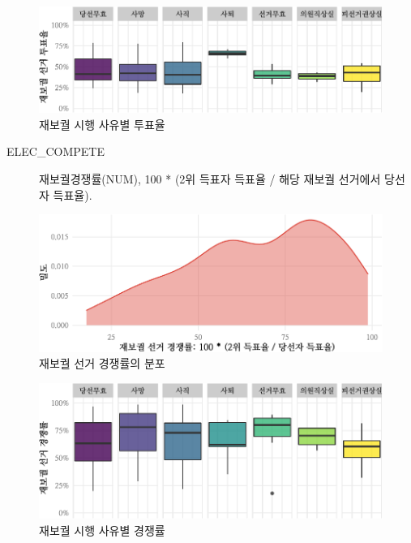 \documentclass[
  11pt,
  letter]{article}
\begin{document}
\begin{figure}
\centering
\includegraphics{Codebook_national_files/figure-latex/unnamed-chunk-4-1.pdf}
\caption{재보궐 시행 사유별 투표율}
\end{figure}

\begin{description}
\item[ELEC\_COMPETE]
재보궐경쟁률(NUM), 100 * (2위 득표자 득표율 / 해당 재보궐 선거에서
당선자 득표율).
\end{description}

\begin{figure}
\centering
\includegraphics{Codebook_national_files/figure-latex/unnamed-chunk-5-1.pdf}
\caption{재보궐 선거 경쟁률의 분포}
\end{figure}

\begin{figure}
\centering
\includegraphics{Codebook_national_files/figure-latex/unnamed-chunk-6-1.pdf}
\caption{재보궐 시행 사유별 경쟁률}
\end{figure}
\end{document}
